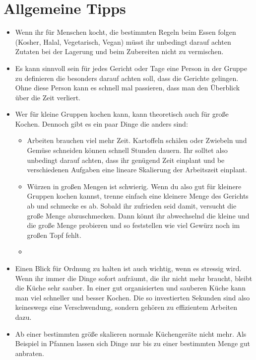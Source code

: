 \section{Allgemeine Tipps}\label{sec:allgemeine-tipps}

\begin{itemize}
    \item Wenn ihr für Menschen kocht, die bestimmten Regeln beim Essen folgen (Kosher, Halal, Vegetarisch, Vegan) müsst ihr unbedingt darauf achten Zutaten bei der Lagerung und beim Zubereiten nicht zu vermischen.
    \item Es kann sinnvoll sein für jedes Gericht oder Tage eine Person in der Gruppe zu definieren die besonders darauf achten soll, dass die Gerichte gelingen.
    Ohne diese Person kann es schnell mal passieren, dass man den Überblick über die Zeit verliert.
    \item Wer für kleine Gruppen kochen kann, kann theoretisch auch für große Kochen.
    Dennoch gibt es ein paar Dinge die anders sind:
    \begin{itemize}
        \item Arbeiten brauchen viel mehr Zeit.
        Kartoffeln schälen oder Zwiebeln und Gemüse schneiden können schnell Stunden dauern.
        Ihr solltet also unbedingt darauf achten, dass ihr genügend Zeit einplant und be verschiedenen Aufgaben eine lineare Skalierung der Arbeitszeit einplant.
        \item Würzen in großen Mengen ist schwierig.
        Wenn du also gut für kleinere Gruppen kochen kannst, trenne einfach eine kleinere Menge des Gerichts ab und schmecke es ab.
        Sobald ihr zufrieden seid damit, versucht die große Menge abzuschmecken.
        Dann könnt ihr abwechselnd die kleine und die große Menge probieren und so feststellen wie viel Gewürz noch im großen Topf fehlt.
        \item
    \end{itemize}
    \item Einen Blick für Ordnung zu halten ist auch wichtig, wenn es stressig wird.
    Wenn ihr immer die Dinge sofort aufräumt, die ihr nicht mehr braucht, bleibt die Küche sehr sauber.
    In einer gut organisierten und sauberen Küche kann man viel schneller und besser Kochen.
    Die so investierten Sekunden sind also keineswegs eine Verschwendung, sondern gehören zu effizientem Arbeiten dazu.
    \item Ab einer bestimmten größe skalieren \glqq normale\grqq{} Küchengeräte nicht mehr.
    Als Beispiel in Pfannen lassen sich Dinge nur bis zu einer bestimmten Menge gut anbraten.

\end{itemize}
